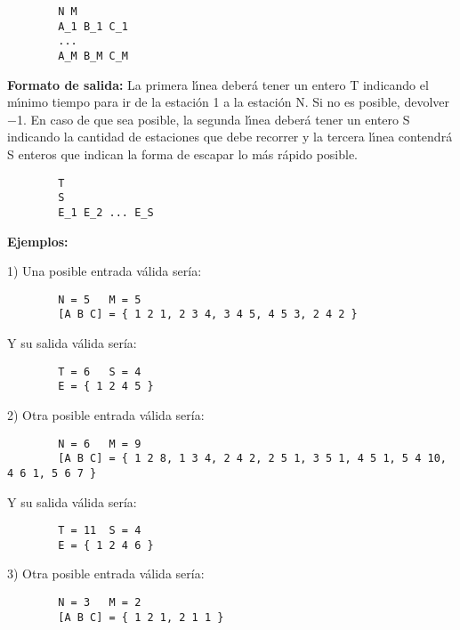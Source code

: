        \begin{verbatim}
        N M
        A_1 B_1 C_1
        ...
        A_M B_M C_M
        \end{verbatim}
        
        \textbf{Formato de salida:} La primera lı́nea deberá tener un entero T indicando el mı́nimo tiempo para ir de la estación 1 a la estación N. Si no es posible, devolver −1. En caso de que sea posible, la segunda lı́nea deberá tener un entero S indicando la cantidad de estaciones que debe recorrer y la tercera lı́nea contendrá S enteros que indican la forma de escapar lo más rápido posible.
        
        \begin{verbatim}
        T
        S
        E_1 E_2 ... E_S
        \end{verbatim}
        
        \textbf{Ejemplos:}
        
        1)
        Una posible entrada válida sería:
        
        \begin{verbatim}
        N = 5   M = 5
        [A B C] = { 1 2 1, 2 3 4, 3 4 5, 4 5 3, 2 4 2 }
        \end{verbatim}

        Y su salida válida sería:

        \begin{verbatim}
        T = 6   S = 4
        E = { 1 2 4 5 }
        \end{verbatim}

        2)
        Otra posible entrada válida sería:
        
        \begin{verbatim}
        N = 6   M = 9
        [A B C] = { 1 2 8, 1 3 4, 2 4 2, 2 5 1, 3 5 1, 4 5 1, 5 4 10, 4 6 1, 5 6 7 }
        \end{verbatim}

        Y su salida válida sería:

        \begin{verbatim}
        T = 11  S = 4
        E = { 1 2 4 6 }
        \end{verbatim}

        3)
        Otra posible entrada válida sería:
        
        \begin{verbatim}
        N = 3   M = 2
        [A B C] = { 1 2 1, 2 1 1 }
        \end{verbatim}

